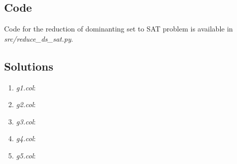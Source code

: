 \documentclass[a4paper,11pt]{article}
\theoremstyle{mytheor}
\begin{document}
\subsection*{Code}

Code for the reduction of dominanting set to SAT problem is available in \textit{src/reduce\_ds\_sat.py}.

\subsection*{Solutions}

\begin{enumerate}
  \item \textit{g1.col}:
  \item \textit{g2.col}:
  \item \textit{g3.col}:
  \item \textit{g4.col}:
  \item \textit{g5.col}:
\end{enumerate}
\end{document}
